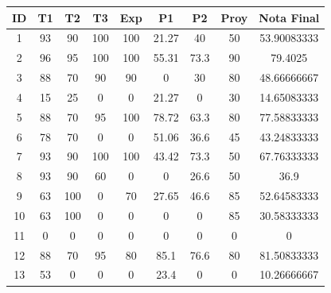 \begin{table}[H]
    \centering
    \begin{tabular}{|c|c|c|c|c|c|c|c|c|}
\hline
\textbf{ID} & \textbf{T1} & \textbf{T2} & \textbf{T3} & \textbf{Exp} & \textbf{P1} & \textbf{P2} & \textbf{Proy} & \textbf{Nota Final} \\ \hline
1           & 93          & 90          & 100         & 100          & 21.27       & 40          & 50            & 53.90083333         \\ \hline
2           & 96          & 95          & 100         & 100          & 55.31       & 73.3        & 90            & 79.4025             \\ \hline
3           & 88          & 70          & 90          & 90           & 0           & 30          & 80            & 48.66666667         \\ \hline
4           & 15          & 25          & 0           & 0            & 21.27       & 0           & 30            & 14.65083333         \\ \hline
5           & 88          & 70          & 95          & 100          & 78.72       & 63.3        & 80            & 77.58833333         \\ \hline
6           & 78          & 70          & 0           & 0            & 51.06       & 36.6        & 45            & 43.24833333         \\ \hline
7           & 93          & 90          & 100         & 100          & 43.42       & 73.3        & 50            & 67.76333333         \\ \hline
8           & 93          & 90          & 60          & 0            & 0           & 26.6        & 50            & 36.9                \\ \hline
9           & 63          & 100         & 0           & 70           & 27.65       & 46.6        & 85            & 52.64583333         \\ \hline
10          & 63          & 100         & 0           & 0            & 0           & 0           & 85            & 30.58333333         \\ \hline
11          & 0           & 0           & 0           & 0            & 0           & 0           & 0             & 0                   \\ \hline
12          & 88          & 70          & 95          & 80           & 85.1        & 76.6        & 80            & 81.50833333         \\ \hline
13          & 53          & 0           & 0           & 0            & 23.4        & 0           & 0             & 10.26666667         \\ \hline

\end{tabular}
\end{table}
